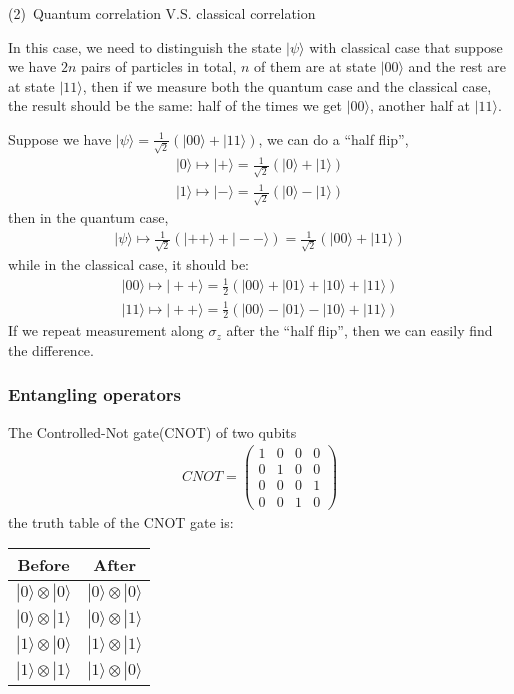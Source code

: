 \documentclass[UTF8,12pt]{article} %
\begin{document}
(2)~Quantum correlation V.S. classical correlation

In this case, we need to distinguish the state $|\psi\rangle$ with classical case that suppose we have $2n$ pairs of particles in total, $n$ of them are at state $|00\rangle$ and the rest are at state $|11\rangle$, then if we measure both the quantum case and the classical case, the result should be the same: half of the times we get $|00\rangle$, another half at $|11\rangle$.

Suppose we have $|\psi\rangle = \frac{1}{\sqrt{2}}\left(|00\rangle + |11\rangle\right)$, we can do a ``half flip'',
\begin{align}
|0\rangle\longmapsto|+\rangle = \frac{1}{\sqrt{2}}(|0\rangle+|1\rangle)\\
|1\rangle\longmapsto|-\rangle = \frac{1}{\sqrt{2}}(|0\rangle-|1\rangle)
\end{align}
then in the quantum case,
\begin{align}
|\psi\rangle\longmapsto \frac{1}{\sqrt{2}}\left(|++\rangle + |--\rangle\right) = \frac{1}{\sqrt{2}}(|00\rangle + |11\rangle)
\end{align}
while in the classical case, it should be:
\begin{align}
|00\rangle\longmapsto |++\rangle = \frac{1}{2}(|00\rangle + |01\rangle + |10\rangle + |11\rangle) \\
|11\rangle\longmapsto |++\rangle = \frac{1}{2}(|00\rangle - |01\rangle - |10\rangle + |11\rangle)
\end{align}
If we repeat measurement along $\sigma_{z}$ after the ``half flip'', then we can easily find the difference.

\subsubsection{Entangling operators}
The Controlled-Not gate(CNOT) of two qubits
\begin{align}
CNOT = \begin{pmatrix}1&0&0&0\\0&1&0&0\\0&0&0&1\\0&0&1&0\end{pmatrix}
\end{align}
the truth table of the CNOT gate is:
\begin{table}[H]\centering
\begin{tabular}{|c|c|}\hline
Before&After\\ \hline
$|0\rangle\otimes|0\rangle$ & $|0\rangle\otimes|0\rangle$\\ \hline
$|0\rangle\otimes|1\rangle$ & $|0\rangle\otimes|1\rangle$\\ \hline
$|1\rangle\otimes|0\rangle$ & $|1\rangle\otimes|1\rangle$\\ \hline
$|1\rangle\otimes|1\rangle$ & $|1\rangle\otimes|0\rangle$\\ \hline
\end{tabular}
\end{table}
\end{document}
